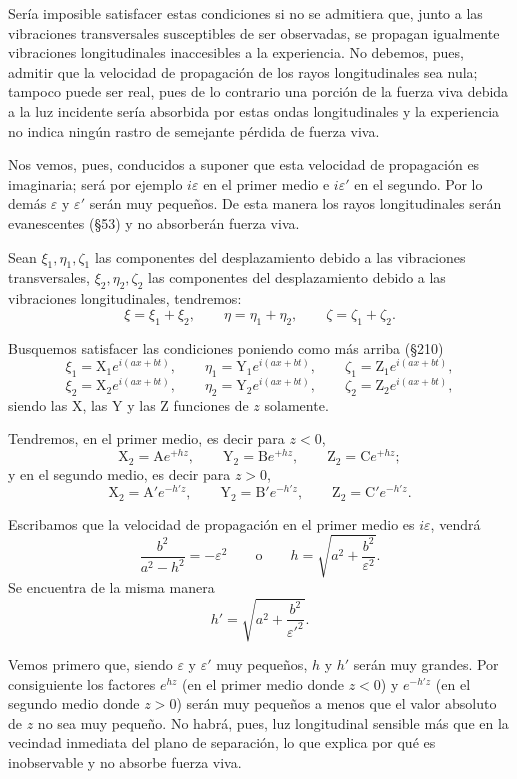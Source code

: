 Sería imposible satisfacer estas condiciones si no se admitiera que,
junto a las vibraciones transversales susceptibles de ser observadas, se
propagan igualmente vibraciones longitudinales inaccesibles a la
experiencia. No debemos, pues, admitir que la velocidad de propagación de
los rayos longitudinales sea nula; tampoco puede ser real, pues de lo contrario una
porción de la fuerza viva debida a la luz incidente sería absorbida por
estas ondas longitudinales y la experiencia no indica ningún rastro de
semejante pérdida de fuerza viva.

Nos vemos, pues, conducidos a suponer que esta velocidad de propagación
es imaginaria; será por ejemplo $i\varepsilon$ en el primer medio e
$i\varepsilon'$ en el segundo. Por lo demás $\varepsilon$ y $\varepsilon'$
serán muy pequeños. De esta manera los rayos longitudinales serán
evanescentes (§53) y no absorberán fuerza viva.

Sean $\xi_1,\eta_1,\zeta_1$ las componentes del desplazamiento debido a
las vibraciones transversales, $\xi_2,\eta_2,\zeta_2$ las componentes del
desplazamiento debido a las vibraciones longitudinales, tendremos:
\[
\xi=\xi_1+\xi_2,\qquad \eta=\eta_1+\eta_2,\qquad \zeta=\zeta_1+\zeta_2.
\]

Busquemos satisfacer las condiciones poniendo como más arriba (§210)
\[
\xi_1=\mathrm{X}_1e^{i(ax+bt)},\qquad \eta_1=\mathrm{Y}_1e^{i(ax+bt)},
\qquad \zeta_1=\mathrm{Z}_1e^{i(ax+bt)},
\]
\[
\xi_2=\mathrm{X}_2e^{i(ax+bt)},\qquad \eta_2=\mathrm{Y}_2e^{i(ax+bt)},
\qquad \zeta_2=\mathrm{Z}_2e^{i(ax+bt)},
\]
siendo las X, las Y y las Z funciones de $z$ solamente.

Tendremos, en el primer medio, es decir para $z<0$,
\[
\mathrm{X}_2=\mathrm{A}e^{+hz},\qquad \mathrm{Y}_2=\mathrm{B}e^{+hz},
\qquad \mathrm{Z}_2=\mathrm{C}e^{+hz};
\]
y en el segundo medio, es decir para $z>0$,
\[
\mathrm{X}_2=\mathrm{A}'e^{-h'z},\qquad \mathrm{Y}_2=\mathrm{B}'e^{-h'z},
\qquad \mathrm{Z}_2=\mathrm{C}'e^{-h'z}.
\]

Escribamos que la velocidad de propagación en el primer medio es
$i\varepsilon$, vendrá
\[
\frac{b^2}{a^2-h^2}=-\varepsilon^2\qquad\text{o}\qquad h=\sqrt{a^2+\frac{b^2}{\varepsilon^2}}.
\]
Se encuentra de la misma manera
\[
h'=\sqrt{a^2+\frac{b^2}{\varepsilon'^2}}.
\]

Vemos primero que, siendo $\varepsilon$ y $\varepsilon'$ muy pequeños, $h$
y $h'$ serán muy grandes. Por consiguiente los factores $e^{hz}$ (en el
primer medio donde $z<0$) y $e^{-h'z}$ (en el segundo medio donde $z>0$)
serán muy pequeños a menos que el valor absoluto de $z$ no sea muy
pequeño. No habrá, pues, luz longitudinal sensible más que en la vecindad
inmediata del plano de separación, lo que explica por qué es inobservable
y no absorbe fuerza viva.

